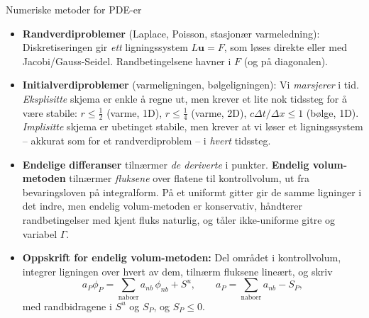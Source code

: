 \begin{oppsum}{Numeriske metoder for PDE-er}
\begin{itemize}
\item \textbf{Randverdiproblemer} (Laplace, Poisson, stasjonær varmeledning): Diskretiseringen gir \emph{ett} ligningssystem $L\mathbf{u}=F$, som løses direkte eller med Jacobi/Gauss-Seidel. Randbetingelsene havner i $F$ (og på diagonalen).
\item \textbf{Initialverdiproblemer} (varmeligningen, bølgeligningen): Vi \emph{marsjerer} i tid. \emph{Eksplisitte} skjema er enkle å regne ut, men krever et lite nok tidssteg for å være stabile: $r\le\frac12$ (varme, 1D), $r\le\frac14$ (varme, 2D), $c\Delta t/\Delta x\le 1$ (bølge, 1D). \emph{Implisitte} skjema er ubetinget stabile, men krever at vi løser et ligningssystem -- akkurat som for et randverdiproblem -- i \emph{hvert} tidssteg.
\item \textbf{Endelige differanser} tilnærmer \emph{de deriverte} i punkter. \textbf{Endelig volum-metoden} tilnærmer \emph{fluksene} over flatene til kontrollvolum, ut fra bevaringsloven på integralform. På et uniformt gitter gir de samme ligninger i det indre, men endelig volum-metoden er konservativ, håndterer randbetingelser med kjent fluks naturlig, og tåler ikke-uniforme gitre og variabel $\Gamma$.
\item \textbf{Oppskrift for endelig volum-metoden:} Del området i kontrollvolum, integrer ligningen over hvert av dem, tilnærm fluksene lineært, og skriv
\[
a_P\phi_P = \sum_{\text{naboer}} a_{nb}\,\phi_{nb} + S^u, \qquad a_P = \sum_{\text{naboer}} a_{nb} - S_P,
\]
med randbidragene i $S^u$ og $S_P$, og $S_P\le 0$.
\end{itemize}
\end{oppsum}
